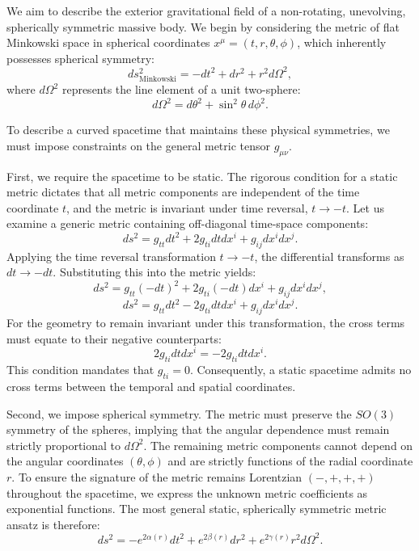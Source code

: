 \documentclass[11pt, a4paper]{report}
\begin{document}
We aim to describe the exterior gravitational field of a non-rotating, unevolving, spherically symmetric massive body. We begin by considering the metric of flat Minkowski space in spherical coordinates $x^\mu = (t, r, \theta, \phi)$, which inherently possesses spherical symmetry:
\begin{equation}
ds_{\text{Minkowski}}^2 = -dt^2 + dr^2 + r^2 d\Omega^2,
\end{equation}
where $d\Omega^2$ represents the line element of a unit two-sphere:
\begin{equation}
d\Omega^2 = d\theta^2 + \sin^2\theta \, d\phi^2.
\end{equation}

To describe a curved spacetime that maintains these physical symmetries, we must impose constraints on the general metric tensor $g_{\mu\nu}$. 

First, we require the spacetime to be static. The rigorous condition for a static metric dictates that all metric components are independent of the time coordinate $t$, and the metric is invariant under time reversal, $t \rightarrow -t$. Let us examine a generic metric containing off-diagonal time-space components:
\begin{equation}
ds^2 = g_{tt} dt^2 + 2 g_{ti} dt dx^i + g_{ij} dx^i dx^j.
\end{equation}
Applying the time reversal transformation $t \rightarrow -t$, the differential transforms as $dt \rightarrow -dt$. Substituting this into the metric yields:
\begin{equation}
ds^2 = g_{tt} (-dt)^2 + 2 g_{ti} (-dt) dx^i + g_{ij} dx^i dx^j,
\end{equation}
\begin{equation}
ds^2 = g_{tt} dt^2 - 2 g_{ti} dt dx^i + g_{ij} dx^i dx^j.
\end{equation}
For the geometry to remain invariant under this transformation, the cross terms must equate to their negative counterparts:
\begin{equation}
2 g_{ti} dt dx^i = -2 g_{ti} dt dx^i.
\end{equation}
This condition mandates that $g_{ti} = 0$. Consequently, a static spacetime admits no cross terms between the temporal and spatial coordinates. 

Second, we impose spherical symmetry. The metric must preserve the $SO(3)$ symmetry of the spheres, implying that the angular dependence must remain strictly proportional to $d\Omega^2$. The remaining metric components cannot depend on the angular coordinates $(\theta, \phi)$ and are strictly functions of the radial coordinate $r$. To ensure the signature of the metric remains Lorentzian $(-, +, +, +)$ throughout the spacetime, we express the unknown metric coefficients as exponential functions. The most general static, spherically symmetric metric ansatz is therefore:
\begin{equation}
ds^2 = -e^{2\alpha(r)} dt^2 + e^{2\beta(r)} dr^2 + e^{2\gamma(r)} r^2 d\Omega^2.
\end{equation}
\end{document}
